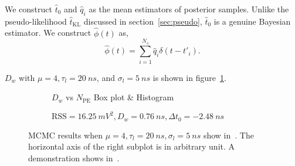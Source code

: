 We construct $\hat{t}_0$ and $\hat{q}_i$ as the mean estimators of posterior samples. Unlike the pseudo-likelihood $\hat{t}_\mathrm{KL}$ discussed in section~\ref{sec:pseudo}, $\hat{t}_0$ is a genuine Bayesian estimator. We construct $\hat{\phi}(t)$ as, 
\begin{equation}
  \label{eq:mcmc-phi}
  \hat{\phi}(t) = \sum_{i=1}^{N_s}\hat{q}_i\delta(t-t'_i).
\end{equation}

$D_w$ with $\mu=4, \tau_l=\SI{20}{ns}$, and $\sigma_l=\SI{5}{ns}$ is shown in figure~\ref{fig:mcmc-npe}.
\begin{figure}[H]
  \begin{subfigure}{.5\textwidth}
    \centering
    \resizebox{\textwidth}{!}{}
    \caption{\label{fig:mcmc-npe} $D_w$ vs $N_{\mathrm{PE}}$ Box plot \& Histogram}
  \end{subfigure}
  \begin{subfigure}{.5\textwidth}
    \centering
    \resizebox{\textwidth}{!}{}
    \caption{\label{fig:mcmc}$\mathrm{RSS}=\SI{16.25}{mV^2},D_w=\SI{0.76}{ns},\Delta{t_0}=\SI{-2.48}{ns}$}
  \end{subfigure}
  \caption{MCMC results when $\mu=4, \tau_l=\SI{20}{ns}, \sigma_l=\SI{5}{ns}$ show in~. The horizontal axis of the right subplot is in arbitrary unit. A demonstration shows in~.}
\end{figure}

